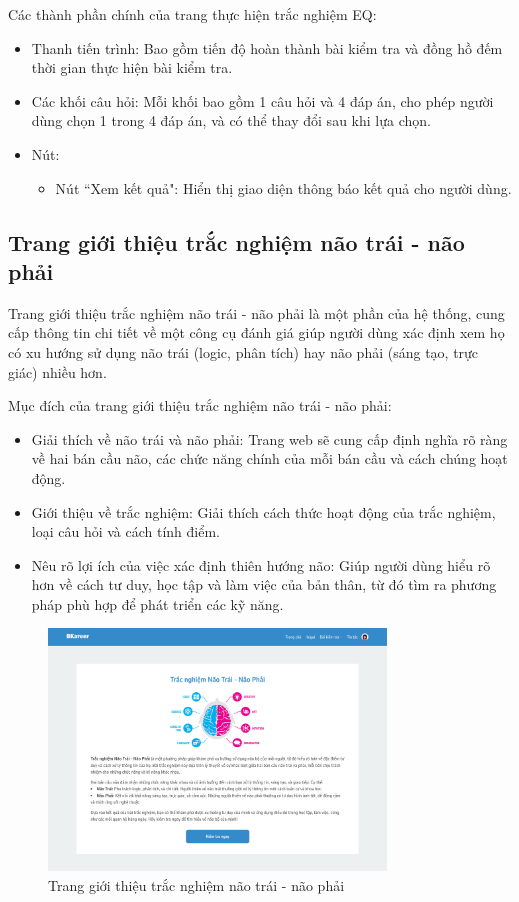 Các thành phần chính của trang thực hiện trắc nghiệm EQ:
\begin{itemize}
    \item Thanh tiến trình: Bao gồm tiến độ hoàn thành bài kiểm tra và đồng hồ đếm thời gian thực hiện bài kiểm tra.
    \item Các khối câu hỏi: Mỗi khối bao gồm 1 câu hỏi và 4 đáp án, cho phép người dùng chọn 1 trong 4 đáp án, và có thể thay đổi sau khi lựa chọn.
    \item Nút:
        \begin{itemize}
            \item Nút ``Xem kết quả": Hiển thị giao diện thông báo kết quả cho người dùng.
        \end{itemize}
\end{itemize}


\subsection{Trang giới thiệu trắc nghiệm não trái - não phải}
Trang giới thiệu trắc nghiệm não trái - não phải là một phần của hệ thống, cung cấp thông tin chi tiết về một công cụ đánh giá giúp người dùng xác định xem họ có xu hướng sử dụng não trái (logic, phân tích) hay não phải (sáng tạo, trực giác) nhiều hơn.

Mục đích của trang giới thiệu trắc nghiệm não trái - não phải:
\begin{itemize}
    \item Giải thích về não trái và não phải: Trang web sẽ cung cấp định nghĩa rõ ràng về hai bán cầu não, các chức năng chính của mỗi bán cầu và cách chúng hoạt động.
    \item Giới thiệu về trắc nghiệm: Giải thích cách thức hoạt động của trắc nghiệm, loại câu hỏi và cách tính điểm.
    \item Nêu rõ lợi ích của việc xác định thiên hướng não: Giúp người dùng hiểu rõ hơn về cách tư duy, học tập và làm việc của bản thân, từ đó tìm ra phương pháp phù hợp để phát triển các kỹ năng.
\end{itemize}

\begin{figure}[H]
    \centering
    \includegraphics[width=0.8\textwidth]
    {images/chap5/lrBrainDetail.png}
    \vspace{0.5cm}
    \caption{Trang giới thiệu trắc nghiệm não trái - não phải}
\end{figure}

